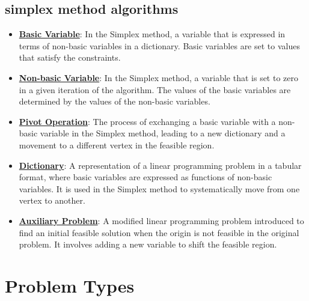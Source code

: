 \documentclass{article}%
\begin{document}
\subsection{simplex method algorithms}%
\label{subsec:simplexmethodalgorithms}%
\begin{itemize}[leftmargin=*]%
\item \href{https://www.math.purdue.edu/~yipn/421/2024-08-27-ExSimplex.pdf#page=6}{\textbf{Basic Variable}}: In the Simplex method, a variable that is expressed in terms of non-basic variables in a dictionary. Basic variables are set to values that satisfy the constraints.%
\item \href{https://www.math.purdue.edu/~yipn/421/2024-08-27-ExSimplex.pdf#page=6}{\textbf{Non-basic Variable}}: In the Simplex method, a variable that is set to zero in a given iteration of the algorithm. The values of the basic variables are determined by the values of the non-basic variables.%
\item \href{https://www.math.purdue.edu/~yipn/421/2024-08-27-ExSimplex.pdf#page=9}{\textbf{Pivot Operation}}: The process of exchanging a basic variable with a non-basic variable in the Simplex method, leading to a new dictionary and a movement to a different vertex in the feasible region.%
\item \href{https://www.math.purdue.edu/~yipn/421/2024-08-27-ExSimplex.pdf#page=26}{\textbf{Dictionary}}: A representation of a linear programming problem in a tabular format, where basic variables are expressed as functions of non-basic variables. It is used in the Simplex method to systematically move from one vertex to another.%
\item \href{https://www.math.purdue.edu/~yipn/421/2024-08-27-ExSimplex.pdf#page=32}{\textbf{Auxiliary Problem}}: A modified linear programming problem introduced to find an initial feasible solution when the origin is not feasible in the original problem. It involves adding a new variable to shift the feasible region.%
\end{itemize}

%
\section{Problem Types}%
\label{sec:ProblemTypes}%
\end{document}
